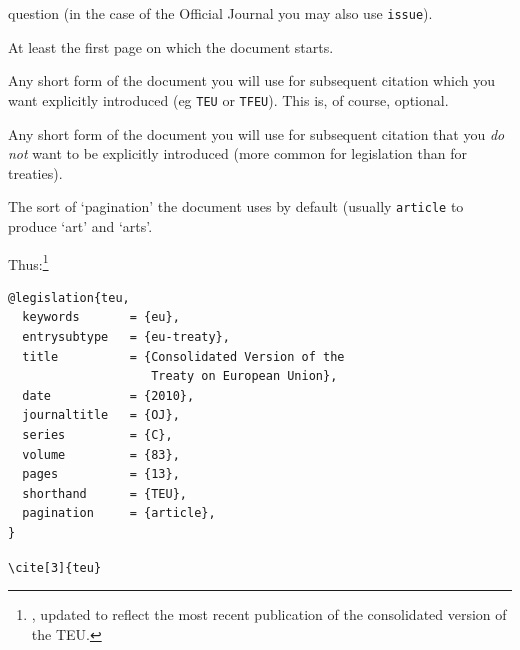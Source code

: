 \documentclass[a4paper,
               11pt,
	       DIV=1,			   
	       footinclude=false]
	      {scrartcl}
\newcounter{egcounter}\setcounter{egcounter}{0}
\newlength{\boxwidth}
\newenvironment{bibexample}[1][]
{%
  \medskip\par\noindent\ignorespaces
  \marginpar{[\refstepcounter{egcounter}\arabic{egcounter}]\label{#1}}%
  \setlength{\boxwidth}{0.95\linewidth}%
  \addtolength{\boxwidth}{-2\fboxsep}
  \addtolength{\boxwidth}{-2\fboxrule}
  \begin{lrbox}{\boxcontainer}
  \begin{minipage}[t]{\boxwidth}%
}
{%
  \end{minipage}\end{lrbox}%
  \colorbox{gray!30}{\usebox{\boxcontainer}}
  \par\medskip}
\newcommand{\egcite}[1]{{\texttt{\textbackslash cite#1}}}
\begin{document}
\begin{description}
  question (in the case of the Official Journal you may also use
  \texttt{issue}).
\item[\texttt{pages}]
 At least the first page on which the document starts.
\item[\texttt{shorthand}]
Any short form of the document you will use
  for subsequent citation which you want explicitly introduced (eg
  \texttt{TEU} or \texttt{TFEU}). This is, of course, optional.
\item[\texttt{shorttitle}]
Any short form of the document you will use
  for subsequent citation that you \emph{do not} want to be explicitly
  introduced (more common for legislation than for treaties).
\item[\texttt{pagination}]
 The sort of `pagination' the document uses
  by default (usually \texttt{article} to produce `art' and `arts'.
\end{description}

Thus:\footnote{\cite[29]{oscola}, updated to reflect the most recent
  publication of the consolidated version of the TEU.}
\begin{bibexample}[teu]
\begin{verbatim}
@legislation{teu,
  keywords       = {eu},
  entrysubtype   = {eu-treaty},
  title          = {Consolidated Version of the 
                    Treaty on European Union},
  date           = {2010},
  journaltitle   = {OJ},
  series         = {C},
  volume         = {83},
  pages          = {13},
  shorthand      = {TEU},
  pagination     = {article},
}
\end{verbatim}
\end{bibexample}

\begin{description}
\item[\egcite{[3]\{teu\}}] \cite[3]{teu}
\end{description}
\end{document}
